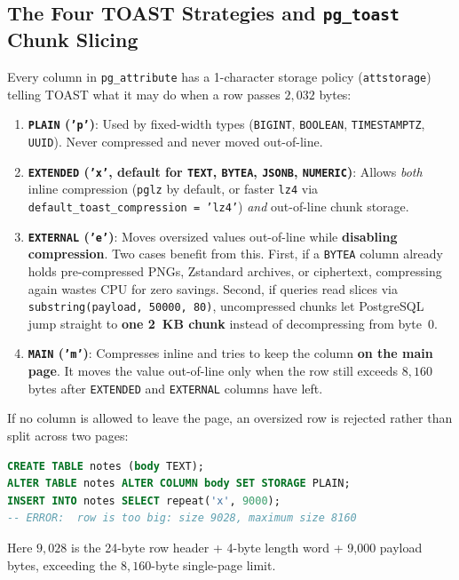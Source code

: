 \subsection{The Four TOAST Strategies and \texttt{pg\_toast} Chunk Slicing}

Every column in \texttt{pg\_attribute} has a 1-character storage policy (\texttt{attstorage}) telling TOAST what it may do when a row passes $2{,}032$ bytes:

\begin{enumerate}
  \item \textbf{\texttt{PLAIN} (\texttt{'p'})}: Used by fixed-width types (\texttt{BIGINT}, \texttt{BOOLEAN}, \texttt{TIMESTAMPTZ}, \texttt{UUID}). Never compressed and never moved out-of-line.
  \item \textbf{\texttt{EXTENDED} (\texttt{'x'}, default for \texttt{TEXT}, \texttt{BYTEA}, \texttt{JSONB}, \texttt{NUMERIC})}: Allows \emph{both} inline compression (\texttt{pglz} by default, or faster \texttt{lz4} via \texttt{default\_toast\_compression = 'lz4'}) \emph{and} out-of-line chunk storage.
  \item \textbf{\texttt{EXTERNAL} (\texttt{'e'})}: Moves oversized values out-of-line while \textbf{disabling compression}. Two cases benefit from this. First, if a \texttt{BYTEA} column already holds pre-compressed PNGs, Zstandard archives, or ciphertext, compressing again wastes CPU for zero savings. Second, if queries read slices via \texttt{substring(payload, 50000, 80)}, uncompressed chunks let PostgreSQL jump straight to \textbf{one 2~KB chunk} instead of decompressing from byte~0.
  \item \textbf{\texttt{MAIN} (\texttt{'m'})}: Compresses inline and tries to keep the column \textbf{on the main page}. It moves the value out-of-line only when the row still exceeds $8{,}160$ bytes after \texttt{EXTENDED} and \texttt{EXTERNAL} columns have left.
\end{enumerate}

If no column is allowed to leave the page, an oversized row is rejected rather than split across two pages:
\begin{lstlisting}[language=SQL]
CREATE TABLE notes (body TEXT);
ALTER TABLE notes ALTER COLUMN body SET STORAGE PLAIN;
INSERT INTO notes SELECT repeat('x', 9000);
-- ERROR:  row is too big: size 9028, maximum size 8160
\end{lstlisting}
Here $9{,}028$ is the 24-byte row header + 4-byte length word + 9,000 payload bytes, exceeding the $8{,}160$-byte single-page limit.

